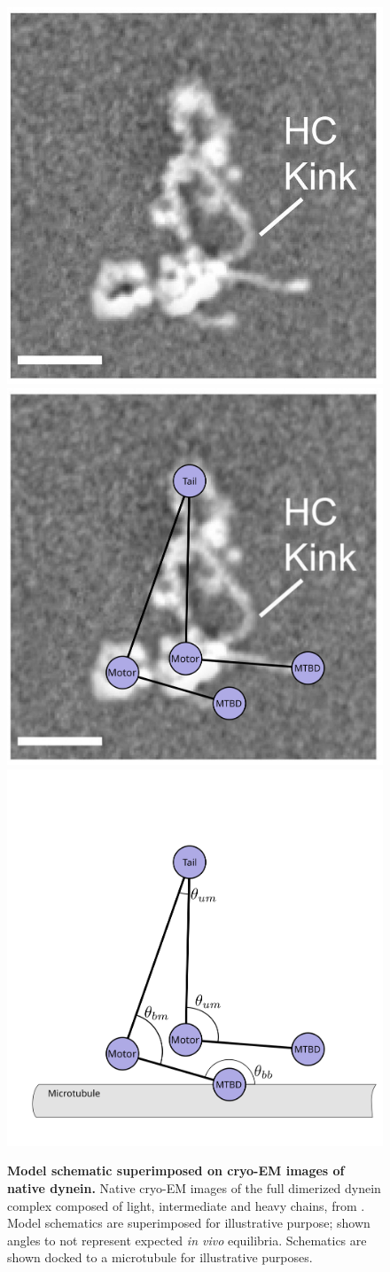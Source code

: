 \documentclass[9pt,twocolumn,twoside]{pnas-new}
\begin{document}
\begin{figure}
   \includegraphics[width=0.3\columnwidth]{figures/schematic-2-cryoem}
   \includegraphics[width=0.3\columnwidth]{figures/schematic-2-superimposed}
   \includegraphics[width=0.3\columnwidth]{figures/schematic-2-model}
   \caption{\textbf{Model schematic superimposed on cryo-EM images of
       native dynein.} Native cryo-EM images of the full dimerized
     dynein complex composed of light, intermediate and heavy chains,
     from \cite{nativestructure}. Model schematics are superimposed
     for illustrative purpose; shown angles to not represent expected
     \textit{in vivo} equilibria. Schematics are shown docked to a
     microtubule for illustrative purposes.}
   \label{fig:modelparams}
\end{figure}
\end{document}
